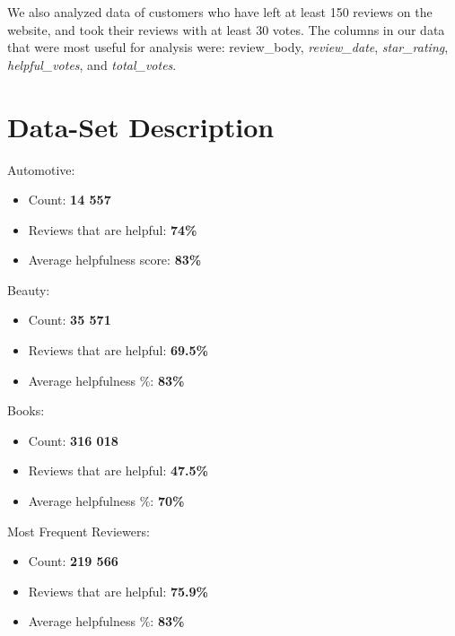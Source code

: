 \documentclass[11pt]{article}
\begin{document}
We also analyzed data of customers who have left at least 150 reviews on the website, and took their reviews with at least 30 votes. The columns in our data that were most useful for analysis were: \textit{}{review\_body}, \textit{review\_date}, \textit{star\_rating}, \textit{helpful\_votes}, and \textit{total\_votes}.

\vspace{0.5em}
\section{Data-Set Description}

Automotive:
\vspace{-0.8em}
\begin{itemize}
\itemsep-0.4em
\item Count: \textbf{14 557}
\item Reviews that are helpful: \textbf{74\%}
\item Average helpfulness score: \textbf{83\%}
\end{itemize}

\noindent Beauty:
\vspace{-0.8em}
\begin{itemize}
\itemsep-0.4em
\item Count: \textbf{35 571}
\item Reviews that are helpful: \textbf{69.5\%}
\item Average helpfulness \%: \textbf{83\%}
\end{itemize}

\noindent Books:
\vspace{-0.8em}
\begin{itemize}
\itemsep-0.4em
\item Count: \textbf{316 018}
\item Reviews that are helpful: \textbf{47.5\%}
\item Average helpfulness \%: \textbf{70\%}
\end{itemize}

\noindent Most Frequent Reviewers:
\vspace{-0.8em}
\begin{itemize}
\itemsep-0.4em
\item Count: \textbf{219 566}
\item Reviews that are helpful: \textbf{75.9\%}
\item Average helpfulness \%: \textbf{83\%}
\end{itemize}

\vspace{0em}
\end{document}
